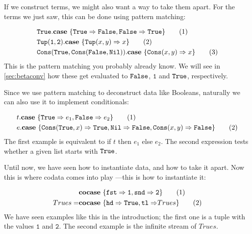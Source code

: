 \documentclass[twoside,12pt,a4paper]{article}
\begin{document}
If we construct terms, we might also want a way to take them apart. 
For the terms we just saw, this can be done using pattern matching:

\begin{example}
    \begin{align*}
        &\mathtt{True}.\textbf{case}\ \{\mathtt{True\Rightarrow False, False\Rightarrow True}\}\tag{1}\\
        &\mathtt{Tup(1,2)}.\textbf{case}\ \{\mathtt{Tup(}x, y\mathtt{)}\Rightarrow x\}\tag{2}\\
        &\mathtt{Cons(True, Cons(False, Nil))}.\textbf{case}\ \{\mathtt{Cons(}x, y\mathtt{)}\Rightarrow x\}\tag{3}   
    \end{align*}
    This is the pattern matching you probably already know. 
    We will see in \cref{sec:betaconv} how these get evaluated to $\mathtt{False}$, $\mathtt{1}$ and $\mathtt{True}$, respectively.
\end{example}

Since we use pattern matching to deconstruct data like Booleans, naturally we can also use it to implement conditionals:
\begin{example}
    \begin{align*}
        &t.\textbf{case}\ \{\mathtt{True}\Rightarrow e_1, \mathtt{False}\Rightarrow e_2\} \tag{1}\\
        &e.\textbf{case}\ \{\mathtt{Cons(}\mathtt{True}, x\mathtt{)}\Rightarrow \mathtt{True}, 
        \mathtt{Nil\Rightarrow False}, \mathtt{Cons(}x, y\mathtt{)}\Rightarrow\mathtt{False}\}\tag{2}
    \end{align*}
The first example is equivalent to if $t$ then $e_1$ else $e_2$. The second expression tests whether a given list starts with $\mathtt{True}$.
\end{example}

Until now, we have seen how to instantiate data, and how to take it apart. 
Now this is where codata comes into play ---this is how to instantiate it:

\begin{example}
    \begin{align*}
        &\textbf{cocase}\ \{\mathtt{fst\Rightarrow 1, snd\Rightarrow 2}\}\tag{1}\\
        Trues =& \textbf{cocase}\ \{\mathtt{hd \Rightarrow True, tl\Rightarrow}Trues\}\tag{2} 
    \end{align*}
    We have seen examples like this in the introduction; the first one is a tuple with the values $\mathtt{1}$ and $\mathtt{2}$.
    The second example is the infinite stream of $Trues$.
\end{example}
\end{document}
